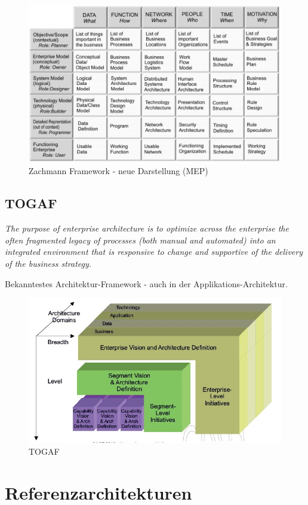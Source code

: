 \begin{figure}[h!]
\centering
\includegraphics[width=\linewidth]{fig/zachmann-model-neue-darstellung}
\caption{Zachmann Framework - neue Darstellung (MEP)}
\label{fig:zachmann-model-neue-darstellung}
\end{figure}

\subsection{TOGAF}

\textit{The purpose of enterprise architecture is to optimize across the enterprise the often fragmented legacy of processes (both manual and automated) into an integrated environment that is responsive to change and supportive of the delivery of the business strategy.}

Bekanntestes Architektur-Framework - auch in der Applikations-Architektur.

\begin{figure}[h!]
\centering
\includegraphics[width=0.6\linewidth]{fig/togaf}
\caption{TOGAF}
\label{fig:togaf}
\end{figure}

\newpage

\section{Referenzarchitekturen}

